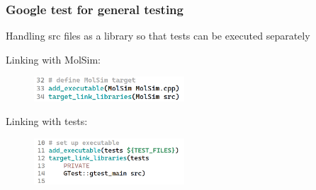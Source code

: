 \begin{frame}
    \frametitle{Google test for general testing}

        Handling src files as a library so that tests can be executed separately

    Linking with MolSim:
    \begin{figure}[H]
        \includegraphics[width=0.5\textwidth]{res/gtest2.png}
    \end{figure}

    Linking with tests:
    \begin{figure}[H]
        \includegraphics[width=0.5\textwidth]{res/gtest4.png}
    \end{figure}

\end{frame}
